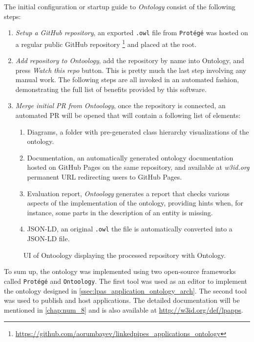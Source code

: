 The initial configuration or startup guide to \textit{Ontology} consist of the following steps: 
\begin{enumerate}
    \item \textit{Setup a GitHub repository}, an exported \texttt{.owl} file from \texttt{Protégé} was hosted on a regular public GitHub repository \footnote{\url{https://github.com/aorumbayev/linkedpipes_applications_ontology}} and placed at the root.
    \item \textit{Add repository to Ontoology}, add the repository by name into Ontology, and press \textit{Watch this repo} button. This is pretty much the last step involving any manual work. The following steps are all invoked in an automated fashion, demonstrating the full list of benefits provided by this software.
    \item \textit{Merge initial PR from Ontoology}, once the repository is connected, an automated PR will be opened that will contain a following list of elements:
    \begin{enumerate}
        \item Diagrams, a folder with pre-generated class hierarchy visualizations of the ontology.
        \item Documentation, an automatically generated ontology documentation hosted on GitHub Pages on the same repository, and available at \textit{w3id.org} permanent URL redirecting users to GitHub Pages.
        \item Evaluation report, \textit{Ontoology} generates a report that checks various aspects of the implementation of the ontology, providing hints when, for instance, some parts in the description of an entity is missing.
        \item JSON-LD, an original \texttt{.owl} the file is automatically converted into a JSON-LD file.  
    \end{enumerate}
\end{enumerate}

\begin{figure}[h]
\centering
{}
\caption{UI of Ontoology displaying the processed repository with \lpas{} Ontology.}
\label{fig:misc_ontoology_ui}
\end{figure}

To sum up, the \lpas{} ontology was implemented using two open-source frameworks called \texttt{Protégé} and \texttt{Ontoology}. The first tool was used as an editor to implement the ontology designed in \autoref{ssec:lpas_application_ontology_arch}. The second tool was used to publish and host applications. The detailed documentation will be mentioned in \autoref{chap:num_8} and is also available at \url{http://w3id.org/def/lpapps}. 

